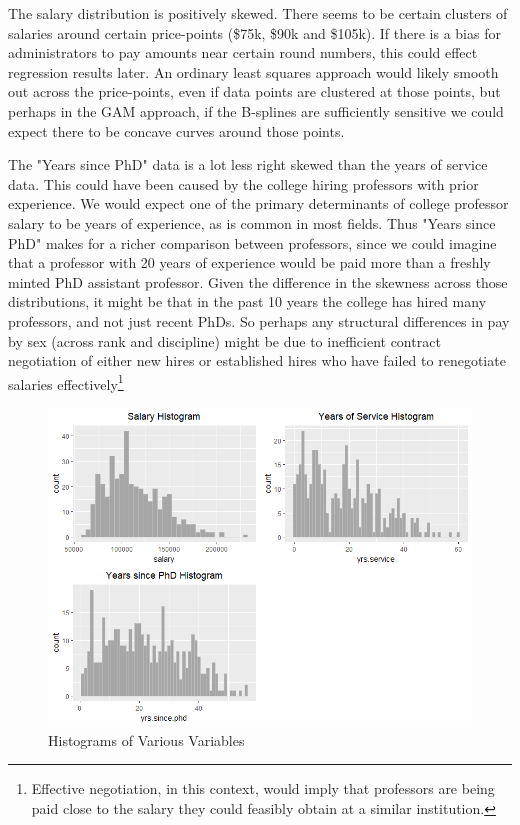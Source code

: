 \documentclass{article}
\begin{document}
\newpage

The salary distribution is positively skewed. There seems to be certain clusters of salaries around certain price-points (\$75k, \$90k and \$105k). If there is a bias for administrators to pay amounts near certain round numbers, this could effect regression results later. An ordinary least squares approach would likely smooth out across the price-points, even if data points are clustered at those points, but perhaps in the GAM approach, if the B-splines are sufficiently sensitive we could expect there to be concave curves around those points. 

The "Years since PhD" data is a lot less right skewed than the years of service data. This could have been caused by the college hiring professors with prior experience. We would expect one of the primary determinants of college professor salary to be years of experience, as is common in most fields. Thus "Years since PhD" makes for a richer comparison between professors, since we could imagine that a professor with 20 years of experience would be paid more than a freshly minted PhD assistant professor. Given the difference in the skewness across those distributions, it might be that in the past 10 years the college has hired many professors, and not just recent PhDs. So perhaps any structural differences in pay by sex (across rank and discipline) might be due to inefficient contract negotiation of either new hires or established hires who have failed to renegotiate salaries effectively\footnote{Effective negotiation, in this context, would imply that professors are being paid close to the salary they could feasibly obtain at a similar institution.}

\begin{figure}[!htb]
    \centering
    \includegraphics[scale=0.75]{Hist1}
    \caption{Histograms of Various Variables}
    \label{hist}
\end{figure}
\end{document}
